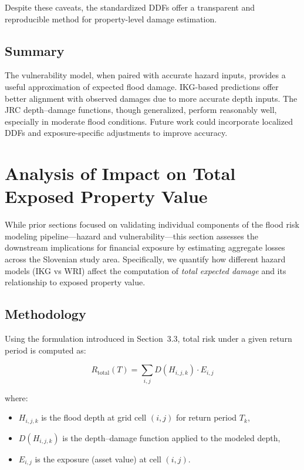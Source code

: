 Despite these caveats, the standardized DDFs offer a transparent and reproducible method for property-level damage estimation.

\subsection{Summary}

The vulnerability model, when paired with accurate hazard inputs, provides a useful approximation of expected flood damage. IKG-based predictions offer better alignment with observed damages due to more accurate depth inputs. The JRC depth--damage functions, though generalized, perform reasonably well, especially in moderate flood conditions. Future work could incorporate localized DDFs and exposure-specific adjustments to improve accuracy.

\section{Analysis of Impact on Total Exposed Property Value}

While prior sections focused on validating individual components of the flood risk modeling pipeline—hazard and vulnerability—this section assesses the downstream implications for financial exposure by estimating aggregate losses across the Slovenian study area. Specifically, we quantify how different hazard models (IKG vs WRI) affect the computation of \textit{total expected damage} and its relationship to exposed property value.

\subsection{Methodology}

Using the formulation introduced in Section~3.3, total risk under a given return period is computed as:

\begin{equation}
	R_{\text{total}}(T) = \sum_{i,j} D(H_{i,j,k}) \cdot E_{i,j}
	\label{eq:total-risk-recap}
\end{equation}

where:
\begin{itemize}
	\item \( H_{i,j,k} \) is the flood depth at grid cell \( (i,j) \) for return period \( T_k \),
	\item \( D(H_{i,j,k}) \) is the depth--damage function applied to the modeled depth,
	\item \( E_{i,j} \) is the exposure (asset value) at cell \( (i,j) \).
\end{itemize}

